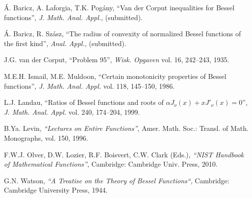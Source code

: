 \documentclass[journal]{IEEEtran}
\begin{document}
\begin{thebibliography}{}

\'A. Baricz, A. Laforgia, T.K. Pog\'any, ``Van der Corput inequalities for Bessel functions'', {\em J. Math. Anal. Appl.}, (submitted).

\'A. Baricz, R. Sz\'asz, ``The radius of convexity of normalized Bessel functions of the first kind'', {\em Anal. Appl.}, (submitted).

 J.G. van der Corput, ``Problem 95'', {\em Wisk. Opgaven} vol. 16, 242--243, 1935.

 M.E.H. Ismail, M.E. Muldoon, ``Certain monotonicity properties of Bessel functions'', {\em J. Math. Anal. Appl.} vol. 118, 145--150, 1986.

L.J. Landau, ``Ratios of Bessel functions and roots of $\alpha{J}_\nu(x)+xJ'_\nu(x)=0$'', {\em J. Math. Anal. Appl.} vol. 240, 174--204, 1999.

{B.Ya. Levin}, {\em ``Lectures on Entire Functions''}, Amer. Math. Soc.: Transl. of Math. Monographs, vol. 150, 1996.

F.W.J. Olver, D.W. Lozier, R.F. Boisvert, C.W. Clark (Eds.), {\em ``NIST Handbook of Mathematical Functions''}, Cambridge: Cambridge Univ. Press, 2010.

{G.N. Watson}, {\em ``A Treatise on the Theory of Bessel Functions``}, Cambridge: Cambridge University Press, 1944.

\end{thebibliography}
\end{document}
